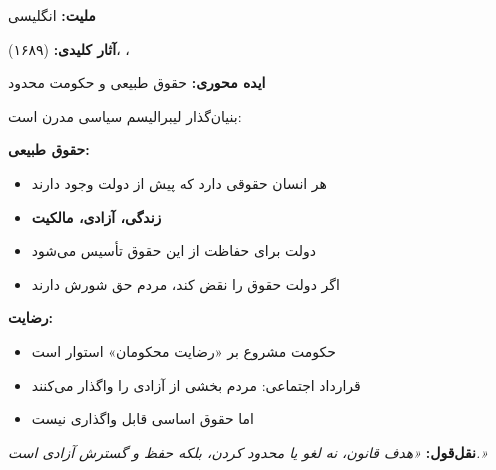\begin{personbox}

\textbf{ملیت:} انگلیسی

\textbf{آثار کلیدی:}  (۱۶۸۹)، ، 

\textbf{ایده محوری:} حقوق طبیعی و حکومت محدود

\mediumspace

 بنیان‌گذار لیبرالیسم سیاسی مدرن است:

\textbf{حقوق طبیعی:}
\begin{itemize}[nosep]
    \item هر انسان حقوقی دارد که پیش از دولت وجود دارند
    \item \textbf{زندگی، آزادی، مالکیت}
    \item دولت برای حفاظت از این حقوق تأسیس می‌شود
    \item اگر دولت حقوق را نقض کند، مردم حق شورش دارند
\end{itemize}

\textbf{رضایت:}
\begin{itemize}[nosep]
    \item حکومت مشروع بر «رضایت محکومان» استوار است
    \item قرارداد اجتماعی: مردم بخشی از آزادی را واگذار می‌کنند
    \item اما حقوق اساسی قابل واگذاری نیست
\end{itemize}

\mediumspace

\textbf{نقل‌قول:} \textit{«هدف قانون، نه لغو یا محدود کردن، بلکه حفظ و گسترش آزادی است.»}
\end{personbox}

